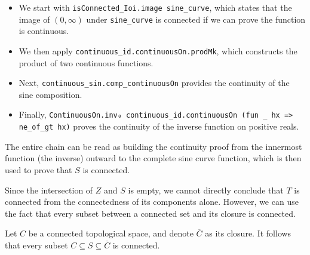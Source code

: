 \begin{itemize}
  \item We start with \lstinline[language=lean]|isConnected_Ioi.image sine_curve|, which states that the image of $(0, \infty)$ under \lstinline[language=lean]|sine_curve| is connected if we can prove the function is continuous.
  \item We then apply \lstinline[language=lean]|continuous_id.continuousOn.prodMk|, which constructs the product of two continuous functions.
  \item Next, \lstinline[language=lean]|continuous_sin.comp_continuousOn| provides the continuity of the sine composition.
  \item Finally, \lstinline[language=lean]|ContinuousOn.inv₀ continuous_id.continuousOn (fun _ hx => ne_of_gt hx)| proves the continuity of the inverse function on positive reals.
\end{itemize}
The entire chain can be read as building the continuity proof from the innermost function (the inverse) outward to the complete sine curve function, which is then used to prove that $S$ is connected.


Since the intersection of $Z$ and $S$ is empty, we cannot
directly conclude that $T$ is connected from the connectedness of its components alone.
However, we can use the fact that every subset between a connected set and its closure is connected.

\begin{theorem}
  Let $C$ be a connected topological space, and denote $\overline{C}$ as its closure.
  It follows that every subset $C \subseteq S \subseteq \overline{C}$ is connected.
\end{theorem}

